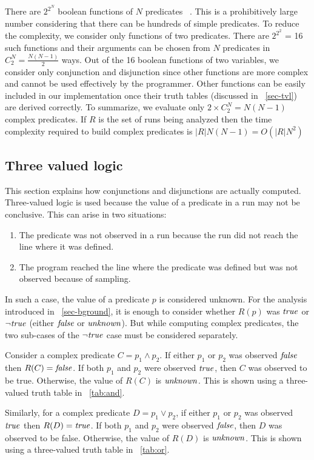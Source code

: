 There are $2^{2^N}$ boolean functions of $N$ predicates ~\cite{MathWorld:BoolFuncs}.  This is a prohibitively large number considering that there can be hundreds of simple predicates.  To reduce the complexity, we consider only functions of two predicates.  There are $2^{2^2}$ = 16 such functions and their arguments can be chosen from $N$ predicates in $C^N_2 = \frac{N(N-1)}{2}$ ways.  Out of the 16 boolean functions of two variables, we consider only conjunction and disjunction since other functions are more complex and cannot be used effectively by the programmer.  Other functions can be easily included in our implementation once their truth tables (discussed in ~\autoref{sec-tvl}) are derived correctly.  To summarize, we evaluate only $2 \times C^N_2 = N(N-1)$ complex predicates.  If $R$ is the set of runs being analyzed then the time complexity required to build complex predicates is $|R|N(N-1) = O(|R|N^2)$

\subsection{Three valued logic}
\label{sec-tvl}
This section explains how conjunctions and disjunctions are actually computed.  Three-valued logic is used because the value of a predicate in a run may not be conclusive. This can arise in two situations:
\begin{enumerate}
\item The predicate was not observed in a run because the run did not reach the line where it was defined.
\item The program reached the line where the predicate was defined but was not observed because of sampling.
\end{enumerate}

In such a case, the value of a predicate $p$ is considered unknown.  For the analysis introduced in ~\autoref{sec-bground}, it is enough to consider whether $R(p)$ was $\mathit{true}$ or $\neg \mathit{true}$ (either $\mathit{false}$ or $\mathit{unknown}$).  But while computing complex predicates, the two sub-cases of the $\neg \mathit{true}$ case must be considered separately.

Consider a complex predicate $C = p_1 \wedge p_2$.  If either $p_1$ or $p_2$ was observed $\mathit{false}$ then $R(C) = \mathit{false}$.  If both $p_1$ and $p_2$ were observed $\mathit{true}$, then $C$ was observed to be true.  Otherwise, the value of $R(C)$ is $\mathit{unknown}$.  This is shown using a three-valued truth table in ~\autoref{tab:and}.

Similarly, for a complex predicate $D = p_1 \vee p_2$, if either $p_1$ or $p_2$ was observed $\mathit{true}$ then $R(D) = \mathit{true}$.  If both $p_1$ and $p_2$ were observed $\mathit{false}$, then $D$ was observed to be false.  Otherwise, the value of $R(D)$ is $\mathit{unknown}$.  This is shown using a three-valued truth table in ~\autoref{tab:or}.

